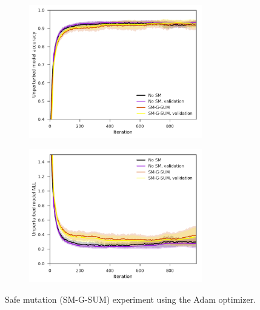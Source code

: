 \begin{figure}[tbp!]
    \begin{subfigure}[b]{0.49\textwidth}
        \centering
        \includegraphics[height=5.8cm]{graphics/E018-SM-analysis/accuracy_unp-all-series-mean-sd.pdf}
        \caption{}
        \label{fig: Theory: E018-SM-analysis/accuracy_unp-all-series-mean-sd}
    \end{subfigure}
    \hfill
    \begin{subfigure}[b]{0.49\textwidth}
        \centering
        \includegraphics[height=5.8cm]{graphics/E018-SM-analysis/return_unp-all-series-mean-sd.pdf}
        \caption{}
        \label{fig: Theory: E018-SM-analysis/return_unp-all-series-mean-sd}
    \end{subfigure}
    \vspace{-0.2cm}
    \caption{Safe mutation (SM-G-SUM) experiment using the Adam optimizer.}
    \label{fig: Theory: E018-SM-analysis}
\end{figure}